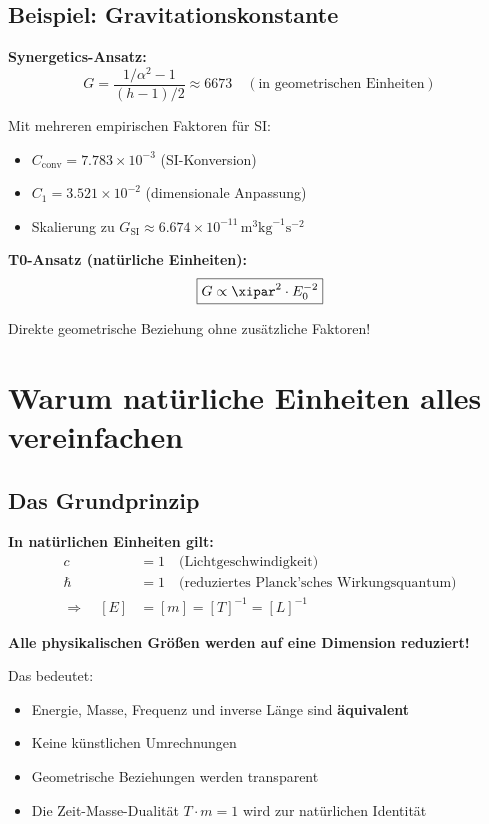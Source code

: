 	\subsection{Beispiel: Gravitationskonstante}
	
	\textbf{Synergetics-Ansatz:}
	\begin{equation}
		G = \frac{1/\alpha^2 - 1}{(h - 1)/2} \approx 6673 \quad (\text{in geometrischen Einheiten})
	\end{equation}
	
	Mit mehreren empirischen Faktoren für SI:
	\begin{itemize}
		\item $C_{\text{conv}} = 7.783 \times 10^{-3}$ (SI-Konversion)
		\item $C_1 = 3.521 \times 10^{-2}$ (dimensionale Anpassung)
		\item Skalierung zu $G_{\text{SI}} \approx 6.674 \times 10^{-11} \, \text{m}^3 \text{kg}^{-1} \text{s}^{-2}$
	\end{itemize}
	
	\textbf{T0-Ansatz (natürliche Einheiten):}
	\begin{equation}
		\boxed{G \propto \xipar^2 \cdot E_0^{-2}}
	\end{equation}
	
	Direkte geometrische Beziehung ohne zusätzliche Faktoren!
	
	\section{Warum natürliche Einheiten alles vereinfachen}
	
	\subsection{Das Grundprinzip}
	
	\begin{vorteil}
		\textbf{In natürlichen Einheiten gilt:}
		\begin{align}
			c &= 1 \quad \text{(Lichtgeschwindigkeit)} \\
			\hbar &= 1 \quad \text{(reduziertes Planck'sches Wirkungsquantum)} \\
			\Rightarrow \quad [E] &= [m] = [T]^{-1} = [L]^{-1}
		\end{align}
		
		\textbf{Alle physikalischen Größen werden auf eine Dimension reduziert!}
		
		Das bedeutet:
		\begin{itemize}
			\item Energie, Masse, Frequenz und inverse Länge sind \textbf{äquivalent}
			\item Keine künstlichen Umrechnungen
			\item Geometrische Beziehungen werden transparent
			\item Die Zeit-Masse-Dualität $T \cdot m = 1$ wird zur natürlichen Identität
		\end{itemize}
	\end{vorteil}
	
